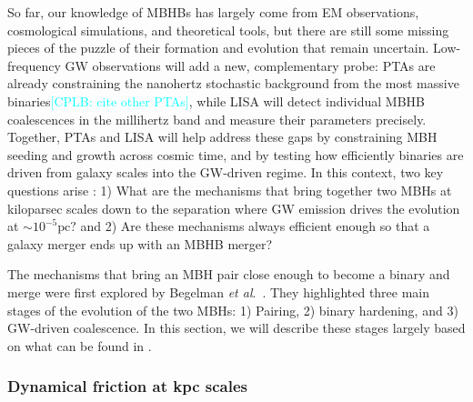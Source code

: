 \documentclass[a4paper,12pt]{article}
\newcommand{\cplb}[1]{\textcolor{cyan}{[CPLB: #1]}}
\begin{document}
So far, our knowledge of MBHBs has largely come from EM observations, cosmological simulations, and theoretical tools, but there are still some missing pieces of the puzzle of their formation and evolution that remain uncertain\cite{krause2025evidence,barausse2023implications}. Low-frequency GW observations will add a new, complementary probe: PTAs are already constraining the nanohertz stochastic background from the most massive binaries\cite{agazie2023nanograv}\cplb{cite other PTAs}, while LISA will detect individual MBHB coalescences in the millihertz band and measure their parameters precisely. Together, PTAs and LISA will help address these gaps by constraining MBH seeding and growth across cosmic time\cite{barausse2023implications,steinle2023implications}, and by testing how efficiently binaries are driven from galaxy scales into the GW-driven regime\cite{barausse2020massive}. In this context, two key questions arise \cite{amaro2023astrophysics}: 1) What are the mechanisms that bring together two MBHs at kiloparsec scales down to the separation where GW emission drives the evolution at $\sim10^{-5} \mathrm{pc}?$ and 2) Are these mechanisms always efficient enough so that a galaxy merger ends up with an MBHB merger? 

The mechanisms that bring an MBH pair close enough to become a binary and merge were first explored by Begelman \textit{et al}.\ \cite{begelman1980massive}. They highlighted three main stages of the evolution of the two MBHs: 1) Pairing, 2) binary hardening, and 3) GW-driven coalescence. In this section, we will describe these stages largely based on what can be found in \cite{amaro2023astrophysics}. 

\subsubsection{Dynamical friction at kpc scales}
\end{document}
